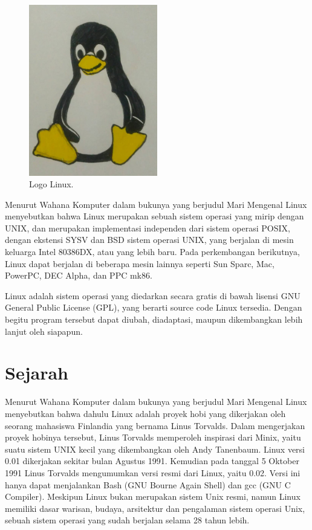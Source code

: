 


\begin{figure}[ht]
\centerline{\includegraphics[width=0.5\textwidth]{figures/linux.jpg}}
\caption{Logo Linux.}
\label{Linux}
\end{figure}

Menurut Wahana Komputer dalam bukunya yang berjudul Mari Mengenal Linux menyebutkan bahwa Linux merupakan sebuah sistem operasi yang mirip dengan UNIX, dan merupakan implementasi independen dari sistem operasi POSIX, dengan ekstensi SYSV dan BSD sistem operasi UNIX, yang berjalan di mesin keluarga Intel 80386DX, atau yang lebih baru. Pada perkembangan berikutnya, Linux dapat berjalan di beberapa mesin lainnya seperti Sun Sparc, Mac, PowerPC, DEC Alpha, dan PPC mk86.\cite{komputer2005mari}

Linux adalah sistem operasi yang diedarkan secara gratis di bawah lisensi GNU General Public License (GPL), yang berarti source code Linux tersedia. Dengan begitu program tersebut dapat diubah, diadaptasi, maupun dikembangkan lebih lanjut oleh siapapun.

\section{Sejarah} 

Menurut Wahana Komputer dalam bukunya yang berjudul Mari Mengenal Linux menyebutkan bahwa dahulu Linux adalah proyek hobi yang dikerjakan oleh seorang mahasiswa Finlandia yang bernama Linus Torvalds. Dalam mengerjakan proyek hobinya tersebut, Linus Torvalds memperoleh inspirasi dari Minix, yaitu suatu sistem UNIX kecil yang dikembangkan oleh Andy Tanenbaum. Linux versi 0.01 dikerjakan sekitar bulan Agustus 1991. Kemudian pada tanggal 5 Oktober 1991 Linus Torvalds mengumumkan versi resmi dari Linux, yaitu 0.02. Versi ini hanya dapat menjalankan Bash (GNU Bourne Again Shell) dan gcc (GNU C Compiler). Meskipun Linux bukan merupakan sistem Unix resmi, namun Linux memiliki dasar warisan, budaya, arsitektur dan pengalaman sistem operasi Unix, sebuah sistem operasi yang sudah berjalan selama 28 tahun lebih. \cite{komputer2005mari}

